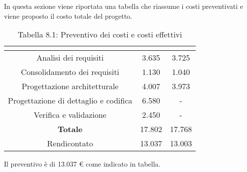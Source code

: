 In questa sezione viene riportata una tabella che riassume i costi preventivati e viene proposto il costo totale del progetto.
\\
\renewcommand{\arraystretch}{1.5}
\begin{table}[H]
\begin{center}
\begin{tabular}{|c|c|c|}
\hline
\rowcolor{title_row}
\textbf{\color{title_text}{Periodo}}  & \textbf{\color{title_text}{Preventivo \euro}} & \textbf{\color{title_text}{Consuntivo \euro}} \\ \hline
Analisi dei requisiti   & 3.635 & 3.725 \\ \hline
Consolidamento dei requisiti   & 1.130 & 1.040 \\ \hline
Progettazione architetturale    & 4.007 & 3.973 \\ \hline
Progettazione di dettaglio e codifica    & 6.580 & - \\ \hline
Verifica e validazione    & 2.450 & - \\ \hline
\textbf{Totale}   & 17.802 & 17.768 \\ \hline
Rendicontato   & 13.037 & 13.003 \\ \hline
\end{tabular}
\caption{Tabella 8.1: Preventivo dei costi e costi effettivi\label{}}
\end{center}
\end{table}
\renewcommand{\arraystretch}{1}

Il preventivo è di 13.037 \euro{} come indicato in tabella.
\newpage
